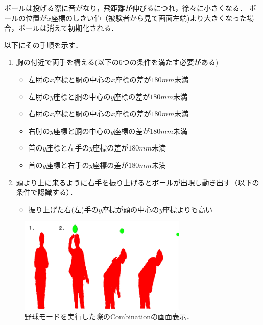 ボールは投げる際に音がなり，飛距離が伸びるにつれ，徐々に小さくなる．
ボールの位置が$x$座標のしきい値（被験者から見て画面左端)より大きくなった場合，ボールは消えて初期化される．
\clearpage

以下にその手順を示す．

\begin{enumerate}
    \item 胸の付近で両手を構える(以下の6つの条件を満たす必要がある)
        \begin{itemize}
            \item 左肘の$x$座標と胴の中心の$x$座標の差が$180mm$未満
            \item 左肘の$y$座標と胴の中心の$y$座標の差が$180mm$未満
            \item 右肘の$x$座標と胴の中心の$x$座標の差が$180mm$未満
            \item 右肘の$y$座標と胴の中心の$y$座標の差が$180mm$未満
            \item 首の$y$座標と左手の$y$座標の差が$180mm$未満
            \item 首の$y$座標と右手の$y$座標の差が$180mm$未満
        \end{itemize}
    \item 頭より上に来るように右手を振り上げるとボールが出現し動き出す（以下の条件で認識する）．
        \begin{itemize}
            \item 振り上げた右(左)手の$y$座標が頭の中心の$y$座標よりも高い
        \end{itemize}
\end{enumerate}


\vspace{1cm}
\begin{figure}[h]
    \centering
    \includegraphics[width=8cm]{image/baseball.png}
    \caption[野球モードを実行した際のCombinationの画面表示]{野球モードを実行した際のCombinationの画面表示．}
  \label{baseball}
\end{figure}
\vspace{1cm}


